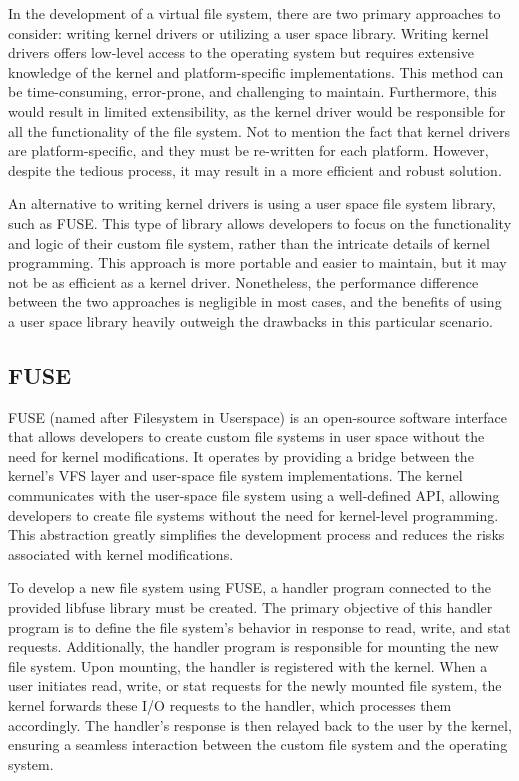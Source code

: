 In the development of a virtual file system, there are two primary approaches to consider: writing kernel drivers or utilizing a user space library.
Writing kernel drivers offers low-level access to the operating system but requires extensive knowledge of the kernel and platform-specific implementations.
This method can be time-consuming, error-prone, and challenging to maintain.
Furthermore, this would result in limited extensibility, as the kernel driver would be responsible for all the functionality of the file system.
Not to mention the fact that kernel drivers are platform-specific, and they must be re-written for each platform.
However, despite the tedious process, it may result in a more efficient and robust solution.

An alternative to writing kernel drivers is using a user space file system library, such as FUSE.
This type of library allows developers to focus on the functionality and logic of their custom file system, rather than the intricate details of kernel programming.
This approach is more portable and easier to maintain, but it may not be as efficient as a kernel driver.
Nonetheless, the performance difference between the two approaches is negligible in most cases, and the benefits of using a user space library heavily outweigh the drawbacks in this particular scenario.

\subsection{FUSE}\label{subsec:fuse}

FUSE (named after Filesystem in Userspace) is an open-source software interface that allows developers to create custom file systems in user space without the need for kernel modifications.
It operates by providing a bridge between the kernel's VFS layer and user-space file system implementations.
The kernel communicates with the user-space file system using a well-defined API, allowing developers to create file systems without the need for kernel-level programming.
This abstraction greatly simplifies the development process and reduces the risks associated with kernel modifications.

To develop a new file system using FUSE, a handler program connected to the provided libfuse library must be created.
The primary objective of this handler program is to define the file system's behavior in response to read, write, and stat requests.
Additionally, the handler program is responsible for mounting the new file system.
Upon mounting, the handler is registered with the kernel.
When a user initiates read, write, or stat requests for the newly mounted file system, the kernel forwards these I/O requests to the handler, which processes them accordingly.
The handler's response is then relayed back to the user by the kernel, ensuring a seamless interaction between the custom file system and the operating system.

